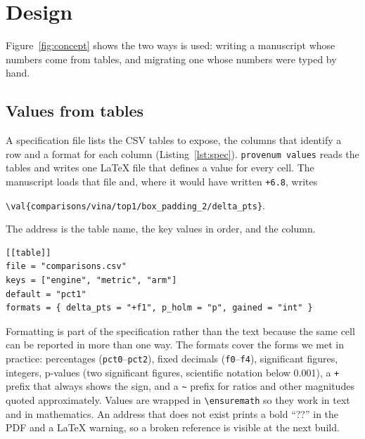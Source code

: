 \section{Design}
\label{sec:design}

Figure~\ref{fig:concept} shows the two ways \pv{} is used: writing a manuscript whose numbers
come from tables, and migrating one whose numbers were typed by hand.



\subsection{Values from tables}

A specification file lists the CSV tables to expose, the columns that identify a row and a format
for each column (Listing~\ref{lst:spec}). \texttt{provenum values} reads the tables and writes one
LaTeX file that defines a value for every cell. The manuscript loads that file and, where it
would have written \texttt{+6.8}, writes
\begin{center}
\texttt{\textbackslash val\{comparisons/vina/top1/box\_padding\_2/delta\_pts\}}.
\end{center}
The address is the table name, the key values in order, and the
column.

\begin{lstlisting}[caption={Part of a specification. Proportions default to percentages with one
decimal; other columns are formatted by name.},label={lst:spec},float=t]
[[table]]
file = "comparisons.csv"
keys = ["engine", "metric", "arm"]
default = "pct1"
formats = { delta_pts = "+f1", p_holm = "p", gained = "int" }
\end{lstlisting}

Formatting is part of the specification rather than the text because the same cell can be
reported in more than one way. The formats cover the forms we met in practice: percentages
(\texttt{pct0}--\texttt{pct2}), fixed decimals (\texttt{f0}--\texttt{f4}), significant figures,
integers, p-values (two significant figures, scientific notation below 0.001), a \texttt{+} prefix
that always shows the sign, and a \texttt{\textasciitilde} prefix for ratios and other magnitudes
quoted approximately. Values are wrapped in \texttt{\textbackslash ensuremath} so they work in
text and in mathematics. An address that does not exist prints a bold ``??'' in the PDF and a
LaTeX warning, so a broken reference is visible at the next build.

